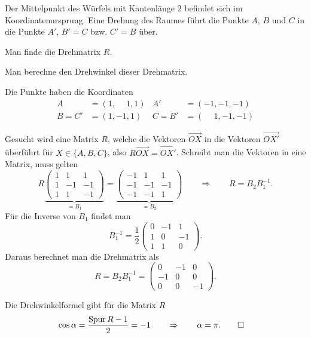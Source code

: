 Der Mittelpunkt des Würfels mit Kantenlänge $2$ befindet sich im
Koordinatenursprung.
Eine Drehung des Raumes führt die Punkte $A$, $B$ und $C$ in
die Punkte $A'$, $B'=C$ bzw. $C'=B$ über.

\begin{center}
\end{center}

\begin{teilaufgaben}
\item
Man finde die Drehmatrix $R$.
\item
Man berechne den Drehwinkel dieser Drehmatrix.
\end{teilaufgaben}

\begin{loesung}
Die Punkte haben die Koordinaten
\begin{align*}
   A&=(1,\phantom{-}1,1) &   A'&=(-1,-1,-1)          \\
B=C'&=(1,-1,1)           & C=B'&=(\phantom{-}1,-1,-1)
\end{align*}
\begin{teilaufgaben}
\item
Gesucht wird eine Matrix $R$, welche die Vektoren $\overrightarrow{OX}$
in die Vektoren $\overrightarrow{OX'}$ überführt für $X\in\{A,B,C\}$,
also $R\overrightarrow{OX}=\overrightarrow{OX'}$.
Schreibt man die Vektoren in eine Matrix, muss gelten
\[
R
\underbrace{
\begin{pmatrix}
1& 1& 1\\
1&-1&-1\\
1& 1&-1
\end{pmatrix}}_{\displaystyle =B_1}
=
\underbrace{
\begin{pmatrix}
-1& 1& 1\\
-1&-1&-1\\
-1&-1& 1
\end{pmatrix}}_{\displaystyle =B_2}
\qquad \Rightarrow\qquad
R=B_2B_1^{-1}.
\]
Für die Inverse von $B_1$ findet man
\[
B_1^{-1}
=
\frac12
\begin{pmatrix}
0&-1& 1\\
1& 0&-1\\
1& 1& 0
\end{pmatrix}.
\]
Daraus berechnet man die Drehmatrix als
\[
R=B_2B_1^{-1}
=
\begin{pmatrix}
 0&-1& 0\\
-1& 0& 0\\
 0& 0&-1
\end{pmatrix}.
\]
\item
Die Drehwinkelformel gibt für die Matrix $R$
\begin{align*}
\cos \alpha 
&=
\frac{\operatorname{Spur}R-1}2=-1
\qquad\Rightarrow\qquad\alpha=\pi.
\qedhere
\end{align*}
\end{teilaufgaben}
\end{loesung}

